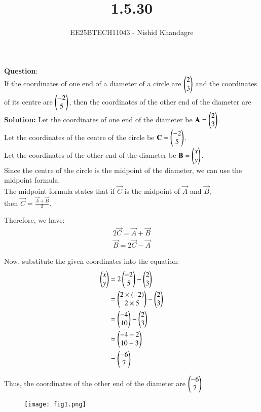 \documentclass[journal]{IEEEtran}
\title{1.5.30}
\author{EE25BTECH11043 - Nishid Khandagre} %
\begin{document}
\maketitle

\renewcommand{\thefigure}{\theenumi}
\renewcommand{\thetable}{\theenumi}


\textbf{Question}:\\
If the coordinates of one end of a diameter of a circle are $\begin{pmatrix}2\\3\end{pmatrix}$ and the coordinates of its centre are $\begin{pmatrix}-2\\5\end{pmatrix}$, then the coordinates of the other end of the diameter are
\\

\textbf{Solution: }
Let the coordinates of one end of the diameter be $\mathbf{A} = \begin{pmatrix}2 \\ 3\end{pmatrix}$.\\
Let the coordinates of the centre of the circle be $\mathbf{C} = \begin{pmatrix}-2 \\ 5\end{pmatrix}$.\\
Let the coordinates of the other end of the diameter be $\mathbf{B} = \begin{pmatrix}x \\ y\end{pmatrix}$.\\

Since the centre of the circle is the midpoint of the diameter, we can use the midpoint formula.\\

The midpoint formula states that if $\vec{C}$ is the midpoint of $\vec{A}$ and $\vec{B}$, \\


then $\vec{C} = \frac{\vec{A} + \vec{B}}{2}$.


Therefore, we have: 
\begin{align}
2\vec{C} = \vec{A} + \vec{B} \\
\vec{B} = 2\vec{C} - \vec{A}
\end{align}


Now, substitute the given coordinates into the equation:
\begin{align}
\begin{pmatrix}x \\ y\end{pmatrix} &= 2 \begin{pmatrix}-2 \\ 5\end{pmatrix} - \begin{pmatrix}2 \\ 3\end{pmatrix} \\
&= \begin{pmatrix}2 \times (-2) \\ 2 \times 5\end{pmatrix} - \begin{pmatrix}2 \\ 3\end{pmatrix} \\
&= \begin{pmatrix}-4 \\ 10\end{pmatrix} - \begin{pmatrix}2 \\ 3\end{pmatrix} \\
&= \begin{pmatrix}-4 - 2 \\ 10 - 3\end{pmatrix} \\
&= \begin{pmatrix}-6 \\ 7\end{pmatrix}
\end{align}


Thus, the coordinates of the other end of the diameter are $\begin{pmatrix}-6 \\ 7\end{pmatrix}$

\begin{figure}[H]
   \centering
  \texttt{[image: fig1.png]}
   \caption{}
   \label{fig:1}
\end{figure}
\end{document}
